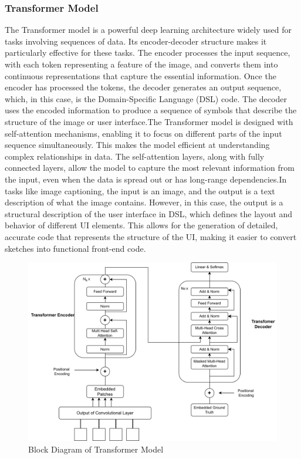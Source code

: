 \subsubsection{Transformer Model}
The Transformer model is a powerful deep learning architecture widely used for tasks involving sequences of data. Its encoder-decoder structure makes it particularly effective for these tasks. The encoder processes the input sequence, with each token representing a feature of the image, and converts them into continuous representations that capture the essential information. Once the encoder has processed the tokens, the decoder generates an output sequence, which, in this case, is the Domain-Specific Language (DSL) code. The decoder uses the encoded information to produce a sequence of symbols that describe the structure of the image or user interface.The Transformer model is designed with self-attention mechanisms, enabling it to focus on different parts of the input sequence simultaneously. This makes the model efficient at understanding complex relationships in data. The self-attention layers, along with fully connected layers, allow the model to capture the most relevant information from the input, even when the data is spread out or has long-range dependencies.In tasks like image captioning, the input is an image, and the output is a text description of what the image contains. However, in this case, the output is a structural description of the user interface in DSL, which defines the layout and behavior of different UI elements. This allows for the generation of detailed, accurate code that represents the structure of the UI, making it easier to convert sketches into functional front-end code.

    \begin{figure}[H]
\includegraphics[scale=.7]{images/Transformer.png}
\caption{Block Diagram of Transformer Model}
\label{fig:transfor}
\end{figure}

